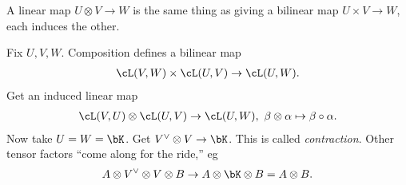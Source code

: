\begin{lem}\label{lem:universal-property-tensor-products}
	A linear map $U\otimes V \to W$ is the same thing as giving a bilinear map $U\times V \to W$, each induces the other.
\end{lem}
\begin{example}\label{example:lec2.35}
	Fix $U,V,W$. Composition defines a bilinear map
	\begin{align*}
		\cL(V,W) \times \cL(U,V) \to \cL(U,W).
	\end{align*}
	Get an induced linear map
	\begin{align*}
		\cL(V,U) \otimes \cL(U,V) \to \cL(U,W), ~ \beta\otimes \alpha \mapsto \beta \circ \alpha.
	\end{align*}
	Now take $U = W = \bK$. Get $V^\vee \otimes V \to \bK$. This is called \emph{contraction}. Other tensor factors ``come along for the ride,'' eg
	\begin{align*}
		A\otimes V^\vee \otimes V\otimes B \to A\otimes \bK \otimes B = A\otimes B.
	\end{align*}
\end{example}






